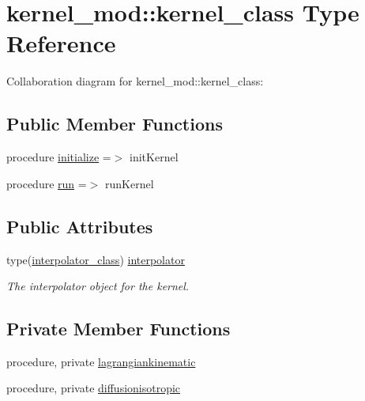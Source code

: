 \hypertarget{structkernel__mod_1_1kernel__class}{}\section{kernel\+\_\+mod\+:\+:kernel\+\_\+class Type Reference}
\label{structkernel__mod_1_1kernel__class}


Collaboration diagram for kernel\+\_\+mod\+:\+:kernel\+\_\+class\+:
\subsection*{Public Member Functions}
\begin{DoxyCompactItemize}
\item 
procedure \mbox{\hyperlink{structkernel__mod_1_1kernel__class_a86a1de717f53f3276df28443b4495cc7}{initialize}} =$>$ init\+Kernel
\item 
procedure \mbox{\hyperlink{structkernel__mod_1_1kernel__class_aa84d6f7ea89eb403e61aed2a0234288c}{run}} =$>$ run\+Kernel
\end{DoxyCompactItemize}
\subsection*{Public Attributes}
\begin{DoxyCompactItemize}
\item 
type(\mbox{\hyperlink{structinterpolator__mod_1_1interpolator__class}{interpolator\+\_\+class}}) \mbox{\hyperlink{structkernel__mod_1_1kernel__class_a9ad0ab75e7c6a0eff5e24d9d5cd3a72d}{interpolator}}
\begin{DoxyCompactList}\small\item\em The interpolator object for the kernel. \end{DoxyCompactList}\end{DoxyCompactItemize}
\subsection*{Private Member Functions}
\begin{DoxyCompactItemize}
\item 
procedure, private \mbox{\hyperlink{structkernel__mod_1_1kernel__class_a955d89ed307afca4483f2ac06c03d8f6}{lagrangiankinematic}}
\item 
procedure, private \mbox{\hyperlink{structkernel__mod_1_1kernel__class_ade7a7d02085be709e7867735294e82a9}{diffusionisotropic}}
\end{DoxyCompactItemize}


